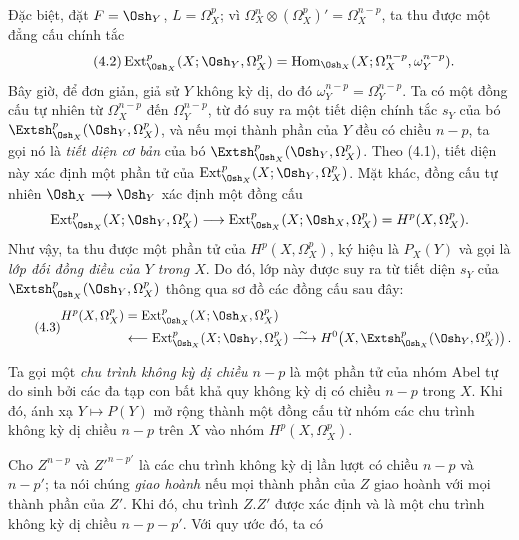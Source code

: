 Đặc biệt, đặt $F=\Osh_Y$, $L=\Omega_X^{p}$; vì
$\Omega_X^{n}\otimes(\Omega_X^{p})'=\Omega_X^{n-p}$, ta thu được một đẳng cấu
chính tắc
\begin{equation}\tag{4.2}
  \operatorname{Ext}_{\Osh_X}^{p}(X;\Osh_Y,\Omega_X^{p})
  =\operatorname{Hom}_{\Osh_X}
  (X;\Omega_X^{n-p},\omega_Y^{n-p}).
\end{equation}
Bây giờ, để đơn giản, giả sử $Y$ không kỳ dị, do đó
$\omega_Y^{n-p}=\Omega_Y^{n-p}$. Ta có một đồng cấu tự nhiên từ
$\Omega_X^{n-p}$ đến $\Omega_Y^{n-p}$, từ đó suy ra một tiết diện chính tắc $s_Y$ của
bó $\Extsh_{\Osh_X}^{p}(\Osh_Y,\Omega_X^{p})$, và nếu
mọi thành phần của $Y$ đều có chiều $n-p$, ta gọi nó là \emph{tiết diện
cơ bản} của bó $\Extsh_{\Osh_X}^{p}(\Osh_Y,\Omega_X^{p})$. Theo (4.1), tiết diện
này xác định một phần tử của
$\operatorname{Ext}_{\Osh_X}^{p}(X;\Osh_Y,\Omega_X^{p})$. Mặt khác, đồng cấu
tự nhiên $\Osh_X\longrightarrow\Osh_Y$ xác định một đồng cấu
\[
  \operatorname{Ext}_{\Osh_X}^{p}(X;\Osh_Y,\Omega_X^{p})
  \longrightarrow
  \operatorname{Ext}_{\Osh_X}^{p}(X;\Osh_X,\Omega_X^{p})
  =H^{p}(X,\Omega_X^{p}).
\]
Như vậy, ta thu được một phần tử của $H^{p}(X,\Omega_X^{p})$, ký hiệu là $P_X(Y)$ và gọi là
\emph{lớp đối đồng điều của $Y$ trong $X$}. Do đó, lớp này được suy ra từ tiết diện
$s_Y$ của $\Extsh_{\Osh_X}^{p}(\Osh_Y,\Omega_X^{p})$ thông qua sơ đồ
các đồng cấu sau đây:
\begin{equation}\tag{4.3}
\begin{aligned}
H^{p}(X,\Omega_X^{p})
&=\operatorname{Ext}_{\Osh_X}^{p}(X;\Osh_X,\Omega_X^{p})\\
&\longleftarrow\operatorname{Ext}_{\Osh_X}^{p}(X;\Osh_Y,\Omega_X^{p})
\xrightarrow{\ \sim\ }
H^{0}\!\left(X,\Extsh_{\Osh_X}^{p}(\Osh_Y,\Omega_X^{p})\right).
\end{aligned}
\end{equation}

Ta gọi một \emph{chu trình không kỳ dị chiều $n-p$} là một phần tử của nhóm
Abel tự do sinh bởi các đa tạp con bất khả quy không kỳ dị có
chiều $n-p$ trong $X$. Khi đó, ánh xạ $Y\longmapsto P(Y)$ mở rộng thành
một đồng cấu từ nhóm các chu trình không kỳ dị chiều $n-p$ trên $X$
vào nhóm $H^{p}(X,\Omega_X^{p})$.

Cho $Z^{n-p}$ và $Z'^{n-p'}$ là các chu trình không kỳ dị lần lượt có chiều $n-p$ và
$n-p'$; ta nói chúng \emph{giao hoành} nếu mọi thành phần
của $Z$ giao hoành với mọi thành phần của $Z'$. Khi đó, chu trình $Z.Z'$ được
xác định và là một chu trình không kỳ dị chiều $n-p-p'$. Với quy ước đó, ta có


